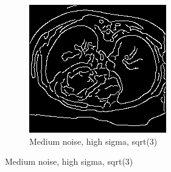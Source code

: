 \begin{figure}[H]
  \begin{subfigure}{.5\textwidth}
    \centering
    \includegraphics[width=.9\textwidth]{./edgedetection/medium_noise/m_noise_h_sigma_sqr3}
    \caption{Medium noise, high sigma, sqrt(3)}
    \label{fig:m_noise_h_sigma_sqr3}
  \end{subfigure}%
  
\end{figure}

